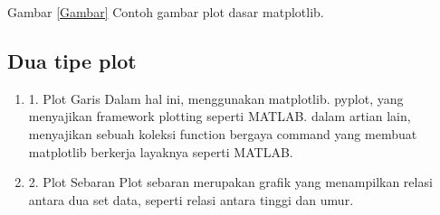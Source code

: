       Gambar \ref{Gambar} Contoh gambar plot dasar matplotlib.
	  
\subsection {Dua tipe plot}
\begin{enumerate}
\item 
	1. Plot Garis
		Dalam hal ini, menggunakan matplotlib. pyplot, yang menyajikan framework plotting seperti MATLAB. dalam artian lain, menyajikan sebuah koleksi function bergaya command yang membuat matplotlib berkerja layaknya seperti MATLAB.
\item
	2. Plot Sebaran
		Plot sebaran merupakan grafik yang menampilkan relasi antara dua set data, seperti relasi antara tinggi dan umur.
\end{enumerate}
	  
	  
